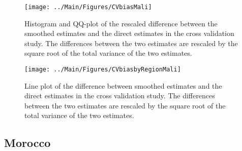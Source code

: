 \documentclass[12pt]{article}\usepackage[]{graphicx}\usepackage[]{color}
\newenvironment{knitrout}{}{} %
\begin{document}
\begin{knitrout}
\color{fgcolor}\begin{figure}[bht]

{\centering \texttt{[image: ../Main/Figures/CVbiasMali]} 

}

\caption[Histogram and QQ-plot of the rescaled difference between the smoothed estimates and the direct estimates in the cross validation study]{Histogram and QQ-plot of the rescaled difference between the smoothed estimates and the direct estimates in the cross validation study. The differences between the two estimates are rescaled by the square root of the total variance of the two estimates.}\label{fig:unnamed-chunk-219}
\end{figure}


\end{knitrout}

\begin{knitrout}
\color{fgcolor}\begin{figure}[bht]

{\centering \texttt{[image: ../Main/Figures/CVbiasbyRegionMali]} 

}

\caption[Line plot of the difference between smoothed estimates and the direct estimates in the cross validation study]{Line plot of the difference between smoothed estimates and the direct estimates in the cross validation study. The differences between the two estimates are rescaled by the square root of the total variance of the two estimates.}\label{fig:unnamed-chunk-220}
\end{figure}


\end{knitrout}


\clearpage
\subsection{Morocco}


\end{document}
